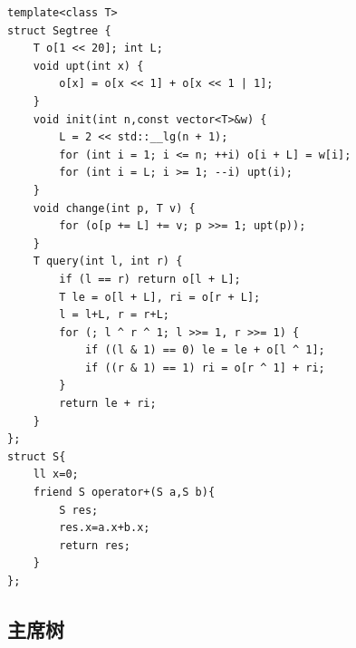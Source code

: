 \documentclass[a4paper,10pt]{article}
\begin{document}
\noindent\begin{lstlisting}
template<class T>
struct Segtree {
    T o[1 << 20]; int L;
    void upt(int x) {
        o[x] = o[x << 1] + o[x << 1 | 1];
    }
    void init(int n,const vector<T>&w) {
        L = 2 << std::__lg(n + 1);
        for (int i = 1; i <= n; ++i) o[i + L] = w[i];
        for (int i = L; i >= 1; --i) upt(i);
    }
    void change(int p, T v) {
        for (o[p += L] += v; p >>= 1; upt(p));
    }
    T query(int l, int r) {
        if (l == r) return o[l + L];
        T le = o[l + L], ri = o[r + L];
        l = l+L, r = r+L;
        for (; l ^ r ^ 1; l >>= 1, r >>= 1) {
            if ((l & 1) == 0) le = le + o[l ^ 1];
            if ((r & 1) == 1) ri = o[r ^ 1] + ri;
        }
        return le + ri;
    }
};
struct S{
    ll x=0;
    friend S operator+(S a,S b){
        S res;
        res.x=a.x+b.x;
        return res;
    }
};\end{lstlisting}

\subsection{主席树}
\thispagestyle{fancy}
\end{document}
